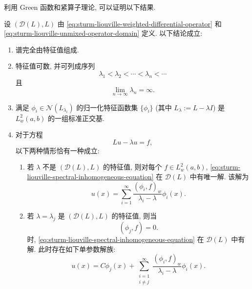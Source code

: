 利用 Green 函数和紧算子理论, 可以证明以下结果.

\begin{Theorem}
\label{thm:regular-sturm-liouville-complete-spectral}
设 $(\mathcal{D}(L),L)$ 由 \eqref{eq:sturm-liouville-weighted-differential-operator} 和 \eqref{eq:sturm-liouville-unmixed-operator-domain} 定义. 以下结论成立:\begin{enumerate}\item 谱完全由特征值组成.\item 特征值可数, 并可列成序列
\begin{equation}\label{eq:sturm-liouville-increasing-eigenvalue-sequence}
\lambda_1<\lambda_2<\cdots<\lambda_n<\cdots
\end{equation}
且
\begin{equation}\label{eq:sturm-liouville-eigenvalues-tend-to-infinity}
\lim_{n\to\infty}\lambda_n=\infty.
\end{equation}
\item 满足 $\phi_i\in\mathcal{N}(L_{\lambda_i})$ 的归一化特征函数集 $\{\phi_i\}$ (其中 $L_\lambda:=L-\lambda I$) 是 $L_w^2(a,b)$ 的一组标准正交基.\item 对于方程
\begin{equation}\label{eq:sturm-liouville-spectral-inhomogeneous-equation}
Lu-\lambda u=f,
\end{equation}
以下两种情形恰有一种成立:\begin{enumerate}[label=(\alph*)]\item 若 $\lambda$ 不是 $(\mathcal{D}(L),L)$ 的特征值, 则对每个 $f\in L_w^2(a,b)$, \eqref{eq:sturm-liouville-spectral-inhomogeneous-equation} 在 $\mathcal{D}(L)$ 中有唯一解. 该解为
\begin{equation}\label{eq:sturm-liouville-noneigenvalue-solution-expansion}
u(x)=\sum_{i=1}^\infty\dfrac{(\phi_i,f)_w}{\lambda_i-\lambda}\phi_i(x).
\end{equation}
\item 若 $\lambda=\lambda_j$ 是 $(\mathcal{D}(L),L)$ 的特征值, 则当
\begin{equation}\label{eq:sturm-liouville-eigenvalue-solvability-condition}
(\phi_j,f)=0.
\end{equation}
时, \eqref{eq:sturm-liouville-spectral-inhomogeneous-equation} 在 $\mathcal{D}(L)$ 中有解. 此时存在如下单参数解族:
\begin{equation}\label{eq:sturm-liouville-eigenvalue-solution-family}
u(x)=C\phi_j(x)+\sum_{\substack{i=1\\i\ne j}}^\infty\dfrac{(\phi_i,f)_w}{\lambda_i-\lambda}\phi_i(x).
\end{equation}
\end{enumerate}\end{enumerate}
\end{Theorem}

